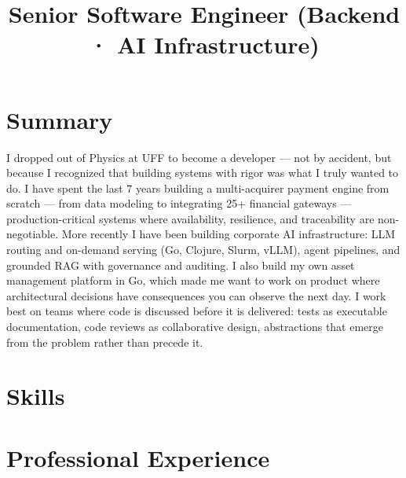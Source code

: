 \documentclass[10pt,a4paper,sans]{moderncv}
\title{Senior Software Engineer (Backend · AI Infrastructure)}
\begin{document}
\makecvtitle

\section{Summary}
I dropped out of Physics at UFF to become a developer --- not by accident, but because I recognized that building systems with rigor was what I truly wanted to do. I have spent the last 7 years building a multi-acquirer payment engine from scratch --- from data modeling to integrating 25+ financial gateways --- production-critical systems where availability, resilience, and traceability are non-negotiable. More recently I have been building corporate AI infrastructure: LLM routing and on-demand serving (Go, Clojure, Slurm, vLLM), agent pipelines, and grounded RAG with governance and auditing. I also build my own asset management platform in Go, which made me want to work on product where architectural decisions have consequences you can observe the next day. I work best on teams where code is discussed before it is delivered: tests as executable documentation, code reviews as collaborative design, abstractions that emerge from the problem rather than precede it.

\section{Skills}

\section{Professional Experience}
\end{document}
